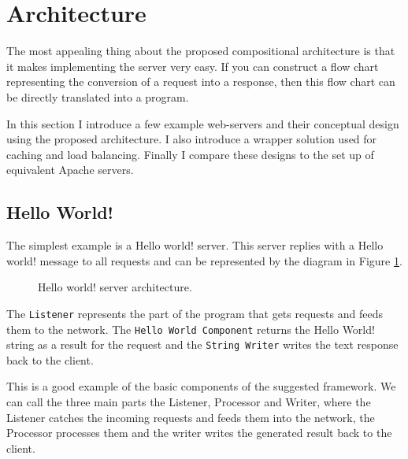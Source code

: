 \documentclass[12pt,a4paper]{article}
\begin{document}
\newpage
\section{Architecture}
\label{sec:arch}
The most appealing thing about the proposed compositional architecture is that
it makes implementing the server very easy. If you can construct a flow chart 
representing the conversion of a request into a response, then this flow chart
can be directly translated into a program.

In this section I introduce a few example web-servers and their conceptual
design using the proposed architecture. I also introduce a wrapper 
solution used for caching and load balancing.
Finally I compare these designs to the set up of equivalent Apache servers.

\subsection{Hello World!}
\label{sec:helloWorld}
The simplest example is a Hello world! server. This server replies with a 
Hello world! message to all requests and can be represented by the diagram
in Figure \ref{fig:helloWorld}.

\begin{figure}[h]
\centering
{}
\caption[scale=1.0]{Hello world! server architecture.}
\label{fig:helloWorld}
\end{figure}

The \texttt{Listener} represents the 
part of the program that gets requests and feeds them to the network.
The \texttt{Hello World Component} returns the Hello World! string as a result 
for the request and the \texttt{String Writer} writes the text response 
back to the client.

This is a good example of the basic components of the suggested framework.
We can call the three main parts the Listener, Processor and Writer, where
the Listener catches the incoming requests and feeds them into the network,
the Processor processes them and the writer writes the generated result 
back to the client.
\end{document}
